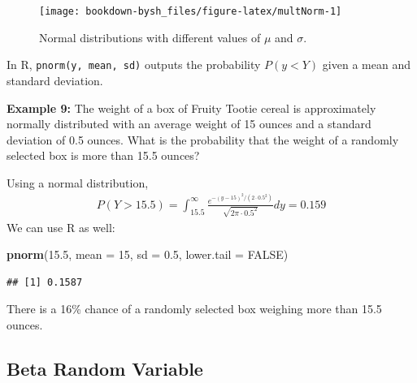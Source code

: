 \documentclass[
]{krantz}
\newenvironment{Shaded}{\begin{snugshade}}{\end{snugshade}}
\newcommand{\DataTypeTok}[1]{\textcolor[rgb]{0.27,0.27,0.27}{#1}}
\newcommand{\DecValTok}[1]{\textcolor[rgb]{0.06,0.06,0.06}{#1}}
\newcommand{\FloatTok}[1]{\textcolor[rgb]{0.06,0.06,0.06}{#1}}
\newcommand{\KeywordTok}[1]{\textcolor[rgb]{0.27,0.27,0.27}{\textbf{#1}}}
\newcommand{\NormalTok}[1]{#1}
\newcommand{\OtherTok}[1]{\textcolor[rgb]{0.37,0.37,0.37}{#1}}
\begin{document}
\begin{figure}

{\centering \texttt{[image: bookdown-bysh\_files/figure-latex/multNorm-1]} 

}

\caption{Normal distributions with different values of \(\mu\) and \(\sigma\).}\label{fig:multNorm}
\end{figure}

In R, \texttt{pnorm(y,\ mean,\ sd)} outputs the probability \(P(y < Y)\) given a mean and standard deviation.

\textbf{Example 9:} The weight of a box of Fruity Tootie cereal is approximately normally distributed with an average weight of 15 ounces and a standard deviation of 0.5 ounces. What is the probability that the weight of a randomly selected box is more than 15.5 ounces?

Using a normal distribution,
\begin{align*} 
P(Y > 15.5) = \int_{15.5}^{\infty} \frac{e^{-(y-15)^2/ (2\cdot 0.5^2)}}{\sqrt{2\pi\cdot 0.5^2}}dy = 0.159
\end{align*}
We can use R as well:

\begin{Shaded}
\begin{Highlighting}[]
\KeywordTok{pnorm}\NormalTok{(}\FloatTok{15.5}\NormalTok{, }\DataTypeTok{mean =} \DecValTok{15}\NormalTok{, }\DataTypeTok{sd =} \FloatTok{0.5}\NormalTok{, }\DataTypeTok{lower.tail =} \OtherTok{FALSE}\NormalTok{)}
\end{Highlighting}
\end{Shaded}

\begin{verbatim}
## [1] 0.1587
\end{verbatim}

There is a 16\% chance of a randomly selected box weighing more than 15.5 ounces.

\hypertarget{beta-random-variable}{%
\subsection{Beta Random Variable}\label{beta-random-variable}}
\end{document}
